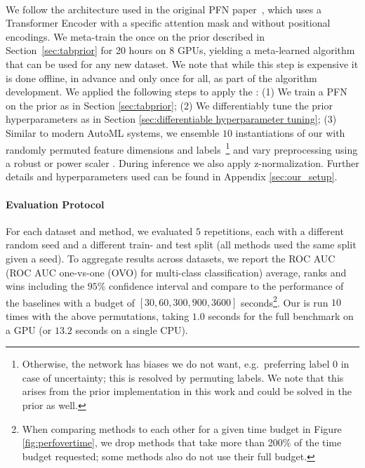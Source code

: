 \documentclass{article}
\begin{document}
\paragraph{\methodname{}} We follow the architecture used in the original PFN paper~\citep{muller-iclr2022}, which uses a Transformer Encoder \citep{vaswani-neurips17} with a specific attention mask and without positional encodings.
We meta-train the \methodname{} once on the prior described in Section~\ref{sec:tabprior} for 20 hours on 8 GPUs, yielding a meta-learned algorithm that can be used for any new dataset.
We note that while this step is expensive it is done offline, in advance and only once for all, as part of the algorithm development.
We applied the following steps to apply the \methodname{}: 
(1) We train a PFN on the prior as in Section \ref{sec:tabprior}; 
(2) We differentiably tune the prior hyperparameters as in Section \ref{sec:differentiable hyperparameter tuning};
(3) Similar to modern AutoML systems, we ensemble $10$ instantiations of our \methodname{} with randomly permuted feature dimensions and labels~\footnote{Otherwise, the network has biases we do not want, e.g.\ preferring label $0$ in case of uncertainty; this is resolved by permuting labels. We note that this arises from the prior implementation in this work and could be solved in the prior as well.} and vary preprocessing using a robust or power scaler \citep{yeo2000new}. During inference we also apply z-normalization. Further details and hyperparameters used can be found in Appendix \ref{sec:our_setup}.

\paragraph{Evaluation Protocol} For each dataset and method, we evaluated $5$ repetitions, each with a different random seed and a different train- and test split (all methods used the same split given a seed). To aggregate results across datasets, we report the ROC AUC (ROC AUC one-vs-one (OVO) for multi-class classification) average, ranks and wins including the $95\%$ confidence interval and compare to the performance of the baselines with a budget of $[30, 60, 300, 900, 3600]$ seconds\footnote{When comparing methods to each other for a given time budget in Figure \ref{fig:perfovertime}, we drop methods that take more than 200\% of the time budget requested; some methods also do not use their full budget.}. Our \methodname{} is run $10$ times with the above permutations, taking $1.0$ seconds for the full benchmark on a GPU (or $13.2$ seconds on a single CPU).%
\end{document}
